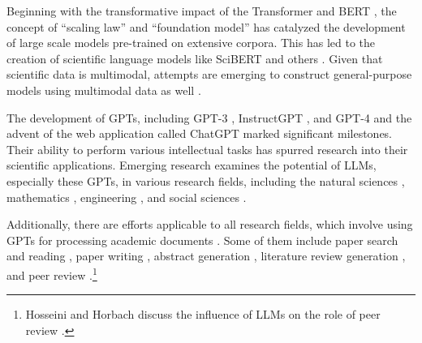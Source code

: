 \documentclass{article}
\begin{document}
Beginning with the transformative impact of the Transformer \cite{vaswani2017attention} and BERT \cite{devlin2018bert}, the concept of ``scaling law'' \cite{kaplan2020scaling} and ``foundation model'' \cite{bommasani2021opportunities} has catalyzed the development of large scale models pre-trained on extensive corpora. This has led to the creation of scientific language models like SciBERT \cite{beltagy2019scibert} and others \cite{cohan2020specter,singh2022scirepeval,nadkarni2021scientific,gupta2022matscibert,taylor2022galactica,azerbayev2023llemma,xie2023darwin,luo2022biogpt,yang2022gatortron,deng2023learning}. Given that scientific data is multimodal, attempts are emerging to construct general-purpose models using multimodal data as well \cite{li2023llava,tu2023towards,takeda2023foundation,nguyen2023climax}.

The development of GPTs, including GPT-3 \cite{brown2020language}, InstructGPT \cite{ouyang2022training}, and GPT-4 \cite{GPT4} and the advent of the web application called ChatGPT  \cite{ChatGPT} marked significant milestones. Their ability to perform various intellectual tasks has spurred research into their scientific applications. Emerging research examines the potential of LLMs, especially these GPTs, in various research fields, including the natural sciences \cite{ai4science2023impact,boiko2023emergent,qin2023gpt,bran2023chemcrow,white2022large,hatakeyama2023prompt,jablonka202314,guo2023can,zheng2023large,qian2023can,wysocka2023large,nori2023capabilities,wang2023large,singhal2023large}, mathematics \cite{frieder2023mathematical,liu2023mathematicallm,wu2023empirical,romeraparedes2023},  engineering \cite{zhang2023automl,bordt2023chatgpt,huang2023benchmarking,pursnani2023performance,zheng2023can,vijay2023prompt,hollmann2023large}, and social sciences \cite{koneru2023can,wang2023survey,bail2023can,ziems2023can,park2023generative,horton2023large,korinek2023generative,aher2023using}.

Additionally, there are efforts applicable to all research fields, which involve using GPTs for processing academic documents \cite{alzaabi2023chatgpt}. Some of them include paper search and reading \cite{elicit,scispace}, paper writing \cite{transformer2022can}, abstract generation \cite{gao2023comparing}, literature review generation \cite{aydin2022openai}, and peer review \cite{wexin2023can,liu2023reviewergpt,robertson2023gpt4}.\footnote{
Hosseini and Horbach discuss the influence of LLMs on the role of peer review \cite{hosseini2023fighting}.
}
\end{document}
